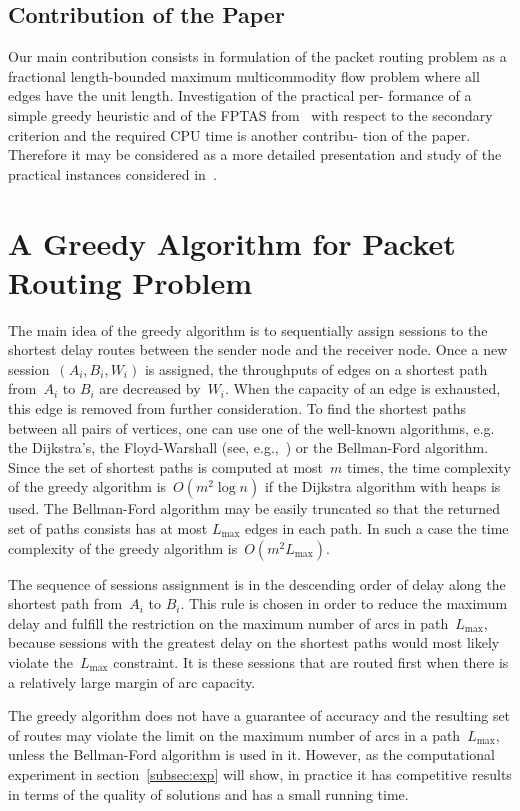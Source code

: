 \documentclass{ifacconf}
\begin{document}
\subsection{Contribution of the Paper}
Our main contribution consists in formulation of the
packet routing problem as a fractional length-bounded
maximum multicommodity flow problem where all edges
have the unit length. Investigation of the practical per-
formance of a simple greedy heuristic and of the FPTAS
from~\cite{BEHTV19} with respect to the secondary
criterion and the required CPU time is another contribu-
tion of the paper. Therefore it may be considered as a more
detailed presentation and study of the practical instances
considered in~\cite{BEHTV19}.


\section{A Greedy Algorithm for Packet Routing Problem} \label{subsec:greedy}

The main idea of the greedy algorithm is to sequentially
assign sessions to the shortest delay routes between the
sender node and the receiver node. Once a new
session~$(A_i,B_i,W_i)$ is assigned, the throughputs of edges on
a shortest path from~$A_i$ to $B_i$ are decreased by~$W_i$.
When the capacity of an edge is exhausted, this edge is
removed from further consideration. To find the shortest paths
between all pairs of vertices, one can use one of the well-known algorithms,
e.g. the  Dijkstra's, the Floyd-Warshall (see, e.g.,~\cite{CLRC01}) or the Bellman-Ford algorithm.
Since the set of shortest paths is computed at most~$m$ times, the time complexity
of the greedy algorithm is~$O(m^2\log n)$ if the Dijkstra algorithm
with heaps is used. The Bellman-Ford algorithm may be easily truncated so that the returned set of paths consists 
has at most $L_{\max}$ edges in each path. In such a case the time 
complexity of the greedy algorithm is~$O(m^2 L_{\max})$.

The sequence of sessions assignment is in the descending order of
delay along the shortest path from~$A_i$ to $B_i$. This rule is chosen
in order to reduce the maximum delay and
fulfill the restriction on the maximum number of arcs in
path~$L_{\max}$, because sessions with the greatest delay on the shortest
paths would most likely violate the~$L_{\max}$ constraint.
It is these sessions that are routed first when there is
a relatively large margin of arc capacity.

The greedy algorithm does not have a guarantee of accuracy and the resulting set of
routes may violate the limit on the maximum number of arcs in a path~$L_{\max}$, unless the Bellman-Ford algorithm is used in it.
However, as the computational experiment in
section~\ref{subsec:exp} will show, in practice it has
competitive results in terms of the quality of solutions and has a small
running time.
\end{document}
